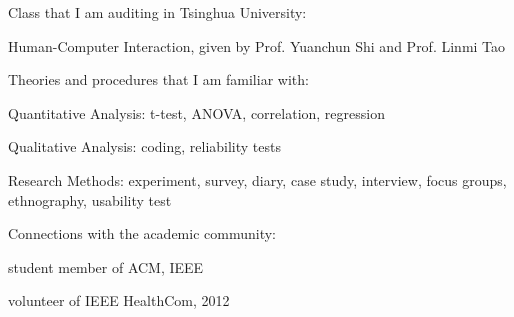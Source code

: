 \documentclass[margin,line]{resume}
\begin{document}
\begin{resume}
    Class that I am auditing in Tsinghua University:
    \begin{list2}
    \item Human-Computer Interaction, given by Prof. Yuanchun Shi and Prof. Linmi Tao
    \end{list2}
    
    Theories and procedures that I am familiar with:
    \begin{list2}
    \item Quantitative Analysis: t-test, ANOVA, correlation, regression
    \item Qualitative Analysis: coding, reliability tests
    \item Research Methods: experiment, survey, diary, case study, interview, focus groups, ethnography, usability test
    \end{list2}
    
    Connections with the academic community:
    \begin{list2}
    \item student member of ACM, IEEE
    \item volunteer of IEEE HealthCom, 2012
    \end{list2}
    

\end{resume}
\end{document}
